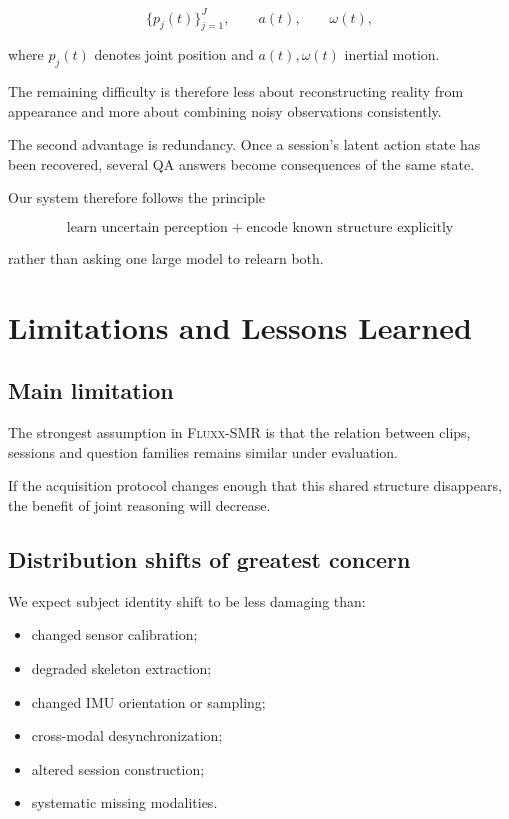 \documentclass[12pt,a4paper]{article}
\newcommand{\method}{\textsc{Fluxx-SMR}}
\begin{document}
\[
\{p_j(t)\}_{j=1}^{J},
\qquad
a(t),
\qquad
\omega(t),
\]

where \(p_j(t)\) denotes joint position and \(a(t),\omega(t)\) inertial motion.

The remaining difficulty is therefore less about reconstructing reality from
appearance and more about combining noisy observations consistently.

The second advantage is redundancy. Once a session's latent action state has
been recovered, several QA answers become consequences of the same state.

Our system therefore follows the principle

\[
\boxed{
\text{learn uncertain perception}
\;+\;
\text{encode known structure explicitly}
}
\]

rather than asking one large model to relearn both.

\section{Limitations and Lessons Learned}

\subsection{Main limitation}

The strongest assumption in \method{} is that the relation between clips,
sessions and question families remains similar under evaluation.

If the acquisition protocol changes enough that this shared structure
disappears, the benefit of joint reasoning will decrease.

\subsection{Distribution shifts of greatest concern}

We expect subject identity shift to be less damaging than:

\begin{itemize}
    \item changed sensor calibration;
    \item degraded skeleton extraction;
    \item changed IMU orientation or sampling;
    \item cross-modal desynchronization;
    \item altered session construction;
    \item systematic missing modalities.
\end{itemize}
\end{document}
